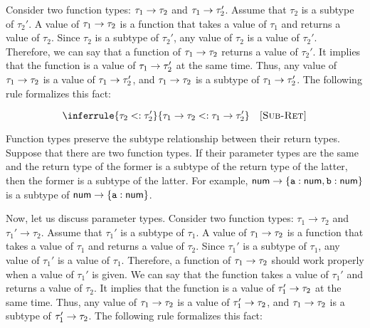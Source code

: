 Consider two function types: $\tau_1\rightarrow\tau_2$ and
$\tau_1\rightarrow\tau_2'$. Assume that $\tau_2$ is a subtype of
$\tau_2'$. A value of $\tau_1\rightarrow\tau_2$ is a function that takes a value
of $\tau_1$ and returns a value of $\tau_2$. Since $\tau_2$ is a subtype of
$\tau_2'$, any value of $\tau_2$ is a value of $\tau_2'$.
Therefore, we can say that a function of $\tau_1\rightarrow\tau_2$ returns a
value of $\tau_2'$. It implies that the function is a value of
$\tau_1\rightarrow\tau_2'$ at the same time. Thus, any value of
$\tau_1\rightarrow\tau_2$ is a value of $\tau_1\rightarrow\tau_2'$, and
$\tau_1\rightarrow\tau_2$ is a subtype of $\tau_1\rightarrow\tau_2'$.
The following rule formalizes this fact:


\vspace{-1em}

\[
  \inferrule
  { \subt{\tau_2}{\tau_2'} }
  { \subt{\tarrow{\tau_1}{\tau_2}}{\tarrow{\tau_1}{\tau_2'}} }
  \quad\textsc{[Sub-Ret]}
\]

Function types preserve the subtype relationship between their return types.
Suppose that there are two function types. If their parameter types are the same
and the return type of the former is a subtype of the return type of the latter, then the
former is a subtype of the latter.
For example, $\textsf{num}\rightarrow\{\texttt{a}:\textsf{num},\texttt{b}:\textsf{num}\}$
is a subtype of $\textsf{num}\rightarrow\{\texttt{a}:\textsf{num}\}$.

Now, let us discuss parameter types.
Consider two function types: $\tau_1\rightarrow\tau_2$ and
$\tau_1'\rightarrow\tau_2$. Assume that $\tau_1'$ is a subtype of
$\tau_1$. A value of $\tau_1\rightarrow\tau_2$ is a function that takes a value
of $\tau_1$ and returns a value of $\tau_2$. Since $\tau_1'$ is a subtype of
$\tau_1$, any value of $\tau_1'$ is a value of $\tau_1$.
Therefore, a function of $\tau_1\rightarrow\tau_2$ should work properly
when a value of $\tau_1'$ is given. We can say that the function takes a value
of $\tau_1'$ and returns a value of $\tau_2$. It implies that the function is a value of
$\tau_1'\rightarrow\tau_2$ at the same time. Thus, any value of
$\tau_1\rightarrow\tau_2$ is a value of $\tau_1'\rightarrow\tau_2$, and
$\tau_1\rightarrow\tau_2$ is a subtype of $\tau_1'\rightarrow\tau_2$.
The following rule formalizes this fact:



